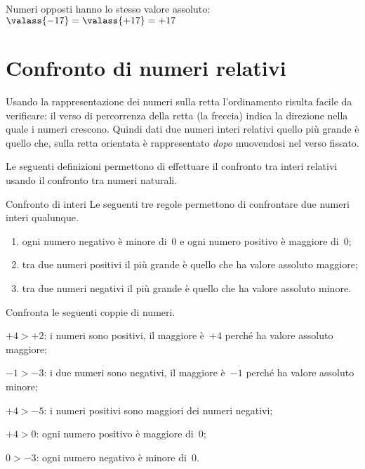 Numeri opposti hanno lo stesso valore assoluto: \qquad 
\(\valass{-17} = \valass{+17} = +17\)

\section{Confronto di numeri relativi}
\label{sec:int_confronto}

Usando la rappresentazione dei numeri sulla retta l'ordinamento risulta 
facile da verificare:
il verso di percorrenza della retta (la freccia) indica la direzione nella 
quale i numeri crescono.
Quindi dati due numeri interi relativi quello più grande è quello che, sulla 
retta orientata è rappresentato \emph{dopo} muovendosi nel verso fissato.

Le seguenti definizioni permettono di effettuare il confronto tra interi 
relativi usando il confronto tra numeri naturali.

\begin{definizione}{Confronto di interi}{}
Le seguenti tre regole permettono di confrontare due numeri interi qualunque.
\begin{enumerate} [noitemsep] %
\item ogni numero negativo è minore di~0 e ogni numero 
positivo è maggiore di~0;
\item tra due numeri positivi il più grande è quello che ha valore 
assoluto maggiore;
\item tra due numeri negativi il più grande è quello che ha valore 
assoluto minore.
\end{enumerate}

\end{definizione}

\begin{esempio}{}{}
Confronta le seguenti coppie di numeri.
\begin{itemize*}
\item \(+4 > +2\): i numeri sono positivi, il maggiore è~\(+4\) perché ha 
valore assoluto maggiore;
\item \(-1 > -3\): i due numeri sono negativi, il maggiore è~\(-1\) perché 
ha valore assoluto minore;
\item \(+4 > -5\): i numeri positivi sono maggiori dei numeri negativi;
\item \(+4 > 0\): ogni numero positivo è maggiore di~0;
\item \(0 > -3\): ogni numero negativo è minore di~0.
\end{itemize*}
\begin{center} \rettaconfronto \end{center}
\end{esempio}

